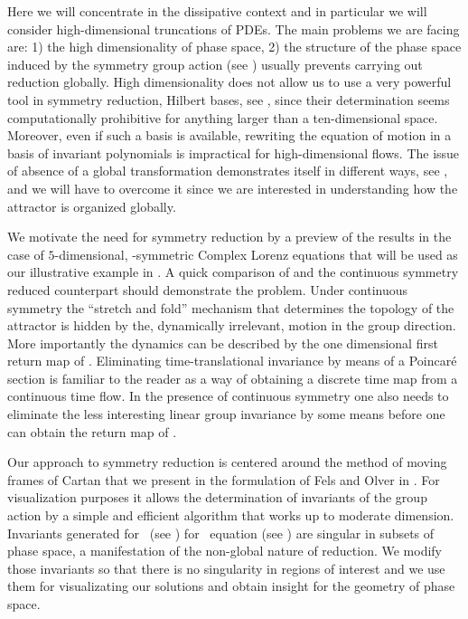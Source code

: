 Here we will concentrate in the dissipative context and in particular we will consider high-dimensional truncations
of PDEs. The main problems we are facing are: 1) the high dimensionality of phase space, 2) the structure of
the phase space induced by the symmetry group action (see ) 
usually prevents carrying out reduction globally.
High dimensionality does not allow us to use a very powerful tool in symmetry reduction, Hilbert bases, 
see , since their determination seems computationally prohibitive for anything larger
than a ten-dimensional space. Moreover, even if such a basis is available,
rewriting the equation of motion in a basis of invariant polynomials is impractical for high-dimensional
flows. The issue of absence of  a global transformation demonstrates itself in different
ways, see , and we will have to overcome it since we are interested in understanding
how the attractor is organized globally.

We motivate the need for symmetry reduction by a preview of the results in the case of $5$-dimensional,
-symmetric Complex Lorenz equations that will be used as our illustrative example in .
 A quick comparison of
 and the continuous symmetry reduced  counterpart should demonstrate the problem.
Under continuous symmetry the ``stretch and fold'' mechanism that determines the topology of the attractor
is hidden by the, dynamically irrelevant, motion in the group direction. More importantly the dynamics can
be described by the one dimensional first return map of . Eliminating time-translational
invariance by means of a Poincar\'e section is familiar to the reader as a way of obtaining a discrete time map from
a continuous time flow. In the presence of continuous symmetry one also needs to eliminate the less interesting
linear group invariance by some means before one can obtain the return map of .

Our approach to symmetry reduction is centered around the method of moving frames of Cartan 
that we present in the formulation of Fels and Olver  in . For visualization
purposes it allows the determination of invariants of the group action by a simple 
and efficient algorithm that works up to moderate dimension. 
Invariants generated for \CLe\ (see ) for \KS\ equation
(see ) are singular in subsets of phase space, a manifestation of the non-global
nature of reduction. We modify those invariants so that there is
no singularity in regions of interest and we use them for visualizating our solutions and obtain insight
for the geometry of phase space.

